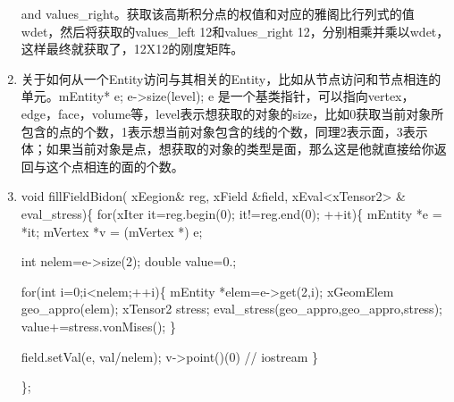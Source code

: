 \documentclass{article}
\begin{document}
\begin{enumerate}
and values\_right。获取该高斯积分点的权值和对应的雅阁比行列式的值wdet，然后将获取的values\_left 12和values\_right
12，分别相乘并乘以wdet，这样最终就获取了，12X12的刚度矩阵。 
\item 关于如何从一个Entity访问与其相关的Entity，比如从节点访问和节点相连的单元。mEntity{*} e; e->size(level);
e 是一个基类指针，可以指向vertex，edge，face，volume等，level表示想获取的对象的size，比如0获取当前对象所包含的点的个数，1表示想当前对象包含的线的个数，同理2表示面，3表示体；如果当前对象是点，想获取的对象的类型是面，那么这是他就直接给你返回与这个点相连的面的个数。 
\item void fillFieldBidon( xEegion\& reg, xField \&field, xEval<xTensor2>
\& eval\_stress)\{
for(xIter it=reg.begin(0); it!=reg.end(0); ++it)\{ mEntity {*}e =
{*}it; mVertex {*}v = (mVertex {*}) e;

int nelem=e->size(2); double value=0.;

for(int i=0;i<nelem;++i)\{ mEntity {*}elem=e->get(2,i); xGeomElem
geo\_appro(elem); xTensor2 stress; eval\_stress(geo\_appro,geo\_appro,stress);
value+=stress.vonMises(); \} 

field.setVal(e, val/nelem); v->point()(0) // iostream \}

\};

\end{enumerate}
\end{document}
